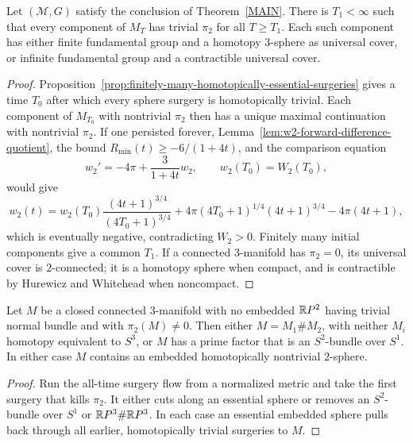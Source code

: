 \begin{proposition}
\label{prop:eventual-trivial-pi2}
\label{pi2}
Let $({\mathcal M},G)$ satisfy the conclusion of Theorem~\ref{MAIN}. There is
$T_1<\infty$ such that every component of $M_T$ has trivial $\pi_2$ for all
$T\ge T_1$. Each such component has either finite fundamental group and a
homotopy $3$-sphere as universal cover, or infinite fundamental group and a
contractible universal cover.
\end{proposition}
\begin{proof}
\sketch Proposition~\ref{prop:finitely-many-homotopically-essential-surgeries}
gives a time $T_0$ after which every sphere surgery is homotopically trivial.
Each component of $M_{T_0}$ with nontrivial $\pi_2$ then has a unique maximal
continuation with nontrivial $\pi_2$. If one persisted forever,
Lemma~\ref{lem:w2-forward-difference-quotient}, the bound
$R_{\min}(t)\ge-6/(1+4t)$, and the comparison equation
\[
w_2'=-4\pi+\frac{3}{1+4t}w_2,
\qquad w_2(T_0)=W_2(T_0),
\]
would give
\[
w_2(t)=w_2(T_0)\frac{(4t+1)^{3/4}}{(4T_0+1)^{3/4}}
+4\pi(4T_0+1)^{1/4}(4t+1)^{3/4}-4\pi(4t+1),
\]
which is eventually negative, contradicting $W_2>0$. Finitely many initial
components give a common $T_1$. If a connected $3$-manifold has $\pi_2=0$,
its universal cover is $2$-connected; it is a homotopy sphere when compact,
and is contractible by Hurewicz and Whitehead when noncompact.
\end{proof}

\begin{corollary}
\label{cor:sphere-theorem-no-rp2}
\label{spherethm}
Let $M$ be a closed connected $3$-manifold with no embedded $\mathbb{R} P^2$ having
trivial normal bundle and with $\pi_2(M)\ne0$. Then either
$M=M_1\#M_2$, with neither $M_i$ homotopy equivalent to $S^3$, or $M$ has a
prime factor that is an $S^2$-bundle over $S^1$. In either case $M$ contains
an embedded homotopically nontrivial $2$-sphere.
\end{corollary}
\begin{proof}
\sketch Run the all-time surgery flow from a normalized metric and take the first
surgery that kills $\pi_2$. It either cuts along an essential sphere or removes
an $S^2$-bundle over $S^1$ or $\mathbb{R} P^3\#\mathbb{R} P^3$. In each case an essential
embedded sphere pulls back through all earlier, homotopically trivial surgeries
to $M$.
\end{proof}

